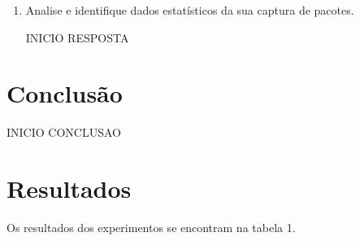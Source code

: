 \documentclass{llncs}
\begin{document}
\begin{enumerate}[\textbf{d)}]
  \item Analise e identifique dados estatísticos da sua captura de pacotes.

  \begin{flushleft}
    INICIO RESPOSTA
  \end{flushleft}
\end{enumerate}


\section{Conclusão}
  \begin{flushleft}
    INICIO CONCLUSAO

  \end{flushleft}

\newpage





%
\section{Resultados}
%
Os resultados dos experimentos se encontram na tabela 1. 
\end{document}
